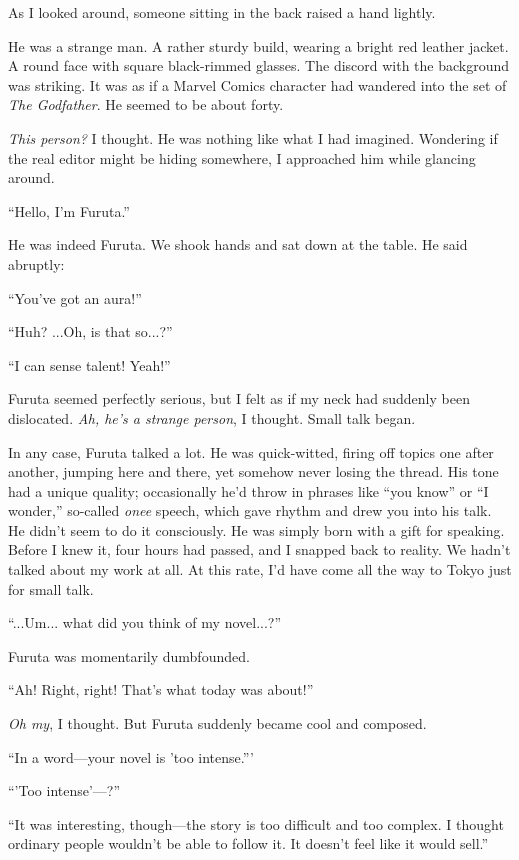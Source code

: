 \documentclass[
    a4paper,
    12pt,
    twoside,
    openany,
    UTF8,
    fontset=windows
]{ctexbook}
\begin{document}
As I looked around, someone sitting in the back raised a hand lightly.

He was a strange man. A rather sturdy build, wearing a bright red leather jacket. A round face with square black-rimmed glasses. The discord with the background was striking. It was as if a Marvel Comics character had wandered into the set of \textit{The Godfather}. He seemed to be about forty.

\emph{This person?} I thought. He was nothing like what I had imagined. Wondering if the real editor might be hiding somewhere, I approached him while glancing around.

``Hello, I'm Furuta.''

He was indeed Furuta. We shook hands and sat down at the table. He said abruptly:

``You've got an aura!''

``Huh? ...Oh, is that so...?''

``I can sense talent! Yeah!''

Furuta seemed perfectly serious, but I felt as if my neck had suddenly been dislocated. \emph{Ah, he's a strange person}, I thought. Small talk began.

In any case, Furuta talked a lot. He was quick-witted, firing off topics one after another, jumping here and there, yet somehow never losing the thread. His tone had a unique quality; occasionally he'd throw in phrases like ``you know'' or ``I wonder,'' so-called \textit{onee} speech, which gave rhythm and drew you into his talk. He didn't seem to do it consciously. He was simply born with a gift for speaking. Before I knew it, four hours had passed, and I snapped back to reality. We hadn't talked about my work at all. At this rate, I'd have come all the way to Tokyo just for small talk.

``...Um... what did you think of my novel...?''

Furuta was momentarily dumbfounded.

``Ah! Right, right! That's what today was about!''

\emph{Oh my}, I thought. But Furuta suddenly became cool and composed.

``In a word---your novel is 'too intense.'''

``'Too intense'---?''

``It was interesting, though---the story is too difficult and too complex. I thought ordinary people wouldn't be able to follow it. It doesn't feel like it would sell.''
\end{document}
